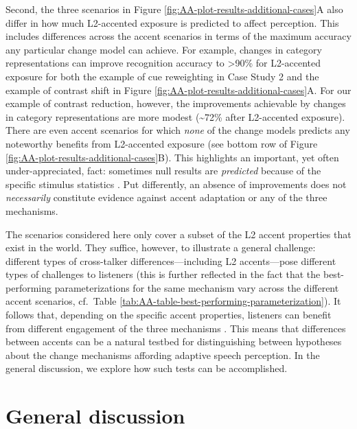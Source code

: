 \documentclass[
  11pt,
  man,floatsintext]{apa6}
\begin{document}
Second, the three scenarios in Figure \ref{fig:AA-plot-results-additional-cases}A also differ in how much L2-accented exposure is predicted to affect perception. This includes differences across the accent scenarios in terms of the maximum accuracy any particular change model can achieve. For example, changes in category representations can improve recognition accuracy to \textgreater90\% for L2-accented exposure for both the example of cue reweighting in Case Study 2 and the example of contrast shift in Figure \ref{fig:AA-plot-results-additional-cases}A. For our example of contrast reduction, however, the improvements achievable by changes in category representations are more modest (\textasciitilde72\% after L2-accented exposure). There are even accent scenarios for which \emph{none} of the change models predicts any noteworthy benefits from L2-accented exposure (see bottom row of Figure \ref{fig:AA-plot-results-additional-cases}B). This highlights an important, yet often under-appreciated, fact: sometimes null results are \emph{predicted} because of the specific stimulus statistics \autocites[see][]{tan2021,zheng-samuel2020}. Put differently, an absence of improvements does not \emph{necessarily} constitute evidence against accent adaptation or any of the three mechanisms.

The scenarios considered here only cover a subset of the L2 accent properties that exist in the world. They suffice, however, to illustrate a general challenge: different types of cross-talker differences---including L2 accents---pose different types of challenges to listeners (this is further reflected in the fact that the best-performing parameterizations for the same mechanism vary across the different accent scenarios, cf.~Table \ref{tab:AA-table-best-performing-parameterization}). It follows that, depending on the specific accent properties, listeners can benefit from different engagement of the three mechanisms \autocite[and different rates of adaptation, see discussion of the flexibility-stability trade-off in][pp.~180-182]{kleinschmidt-jaeger2015}. This means that differences between accents can be a natural testbed for distinguishing between hypotheses about the change mechanisms affording adaptive speech perception. In the general discussion, we explore how such tests can be accomplished.

\hypertarget{sec:general-discussion}{%
\section{General discussion}\label{sec:general-discussion}}
\end{document}
